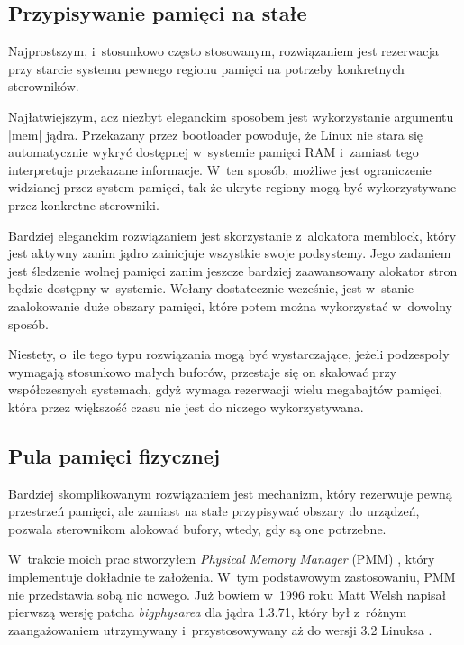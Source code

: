 \subsection{Przypisywanie pamięci na stałe}

Najprostszym, i~stosunkowo często stosowanym, rozwiązaniem jest
rezerwacja przy starcie systemu pewnego regionu pamięci na potrzeby
konkretnych sterowników.

Najłatwiejszym, acz niezbyt eleganckim sposobem jest wykorzystanie
argumentu \code|mem| jądra.  Przekazany przez bootloader powoduje, że
Linux nie stara się automatycznie wykryć dostępnej w~systemie pamięci
RAM i~zamiast tego interpretuje przekazane informacje.  W~ten sposób,
możliwe jest ograniczenie widzianej przez system pamięci, tak że
ukryte regiony mogą być wykorzystywane przez konkretne sterowniki.

Bardziej eleganckim rozwiązaniem jest skorzystanie z~alokatora
memblock, który jest aktywny zanim jądro zainicjuje wszystkie swoje
podsystemy.  Jego zadaniem jest śledzenie wolnej pamięci zanim jeszcze
bardziej zaawansowany alokator stron będzie dostępny w~systemie.
Wołany dostatecznie wcześnie, jest w~stanie zaalokowanie duże obszary
pamięci, które potem można wykorzystać w~dowolny sposób.

Niestety, o~ile tego typu rozwiązania mogą być wystarczające, jeżeli
podzespoły wymagają stosunkowo małych buforów, przestaje się on
skalować przy współczesnych systemach, gdyż wymaga rezerwacji wielu
megabajtów pamięci, która przez większość czasu nie jest do niczego
wykorzystywana.

\subsection{Pula pamięci fizycznej}

Bardziej skomplikowanym rozwiązaniem jest mechanizm, który rezerwuje
pewną przestrzeń pamięci, ale zamiast na stałe przypisywać obszary do
urządzeń, pozwala sterownikom alokować bufory, wtedy, gdy są one
potrzebne.

W~trakcie moich prac stworzyłem \textit{Physical Memory Manager} (PMM)
\autocite{patch:pmm}, który implementuje dokładnie te założenia. W~tym
podstawowym zastosowaniu, PMM nie przedstawia sobą nic nowego.  Już
bowiem w~1996 roku Matt Welsh napisał pierwszą wersję patcha
\emph{bigphysarea} dla jądra 1.3.71, który był z~różnym zaangażowaniem
utrzymywany i~przystosowywany aż do wersji 3.2 Linuksa
\autocite{patch:bigphys}.

